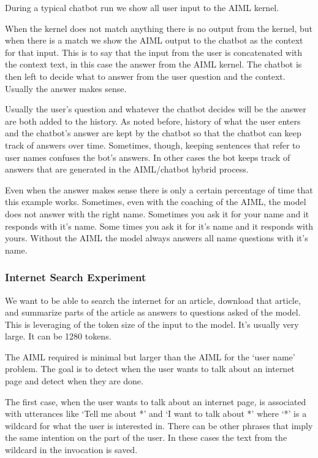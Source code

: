 During a typical chatbot run we show all user input to the AIML kernel. 

When the kernel does not match anything there is no output from the kernel, but when there is a match we show the AIML output to the chatbot as the context for that input. This is to say that the input from the user is concatenated with the context text, in this case the answer from the AIML kernel. The chatbot is then left to decide what to answer from the user question and the context. Usually the answer makes sense.

Usually the user's question and whatever the chatbot decides will be the answer are both added to the history. As noted before, history of what the user enters and the chatbot's answer are kept by the chatbot so that the chatbot can keep track of answers over time. Sometimes, though, keeping sentences that refer to user names confuses the bot's answers. In other cases the bot keeps track of answers that are generated in the AIML/chatbot hybrid process.

Even when the answer makes sense there is only a certain percentage of time that this example works. Sometimes, even with the coaching of the AIML, the model does not answer with the right name. Sometimes you ask it for your name and it responds with it's name. Some times you ask it for it's name and it responds with yours. Without the AIML the model always answers all name questions with it's name.

\subsubsection{Internet Search Experiment}

We want to be able to search the internet for an article, download that article, and summarize parts of the article as answers to questions asked of the model. This is leveraging of the token size of the input to the model. It's usually very large. It can be 1280 tokens.

The AIML required is minimal but larger than the AIML for the `user name' problem. The goal is to detect when the user wants to talk about an internet page and detect when they are done.

The first case, when the user wants to talk about an internet page, is associated with utterances like `Tell me about *' and `I want to talk about *' where `*' is a wildcard for what the user is interested in. There can be other phrases that imply the same intention on the part of the user. In these cases the text from the wildcard in the invocation is saved.

